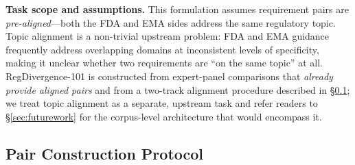 \documentclass[manuscript]{acmart}
\begin{document}
\begin{revblock}
\textbf{Task scope and assumptions.} This formulation assumes requirement pairs
are \textit{pre-aligned}---both the FDA and EMA sides address the same
regulatory topic. Topic alignment is a non-trivial upstream problem: FDA and
EMA guidance frequently address overlapping domains at inconsistent levels of
specificity, making it unclear whether two requirements are ``on the same
topic'' at all. RegDivergence-101 is constructed from expert-panel comparisons
that \textit{already provide aligned pairs} and from a two-track alignment
procedure described in \S\ref{sec:dataset}; we treat topic alignment as a
separate, upstream task and refer readers to \S\ref{sec:futurework} for the
corpus-level architecture that would encompass it.
\end{revblock}

\subsection{Pair Construction Protocol}
\label{sec:dataset}
\end{document}
